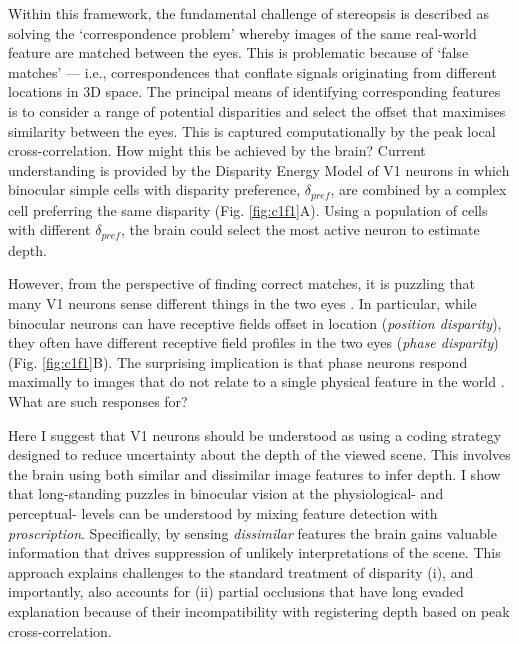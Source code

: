Within this framework, the fundamental challenge of stereopsis is described as solving the `correspondence problem' \cite{Julesz:1971uq,Marr:1976dq,Scharstein:2002by} whereby images of the same real-world feature are matched between the eyes. This is problematic because of `false matches' --- i.e., correspondences that conflate signals originating from different locations in 3D space. The principal means of identifying corresponding features is to consider a range of potential disparities and select the offset that maximises similarity between the eyes. This is captured computationally by the peak local cross-correlation. How might this be achieved by the brain? Current understanding is provided by the Disparity Energy Model of V1 neurons \cite{Ohzawa:1990cq, Fleet:1996tq, Qian:1997bu} in which binocular simple cells with disparity preference, $\delta_{pref}$, are combined by a complex cell preferring the same disparity (Fig. \ref{fig:c1f1}A). Using a population of cells with different $\delta_{pref}$, the brain could select the most active neuron to estimate depth.

However, from the perspective of finding correct matches, it is puzzling that many V1 neurons sense different things in the two eyes \cite{DeAngelis:1991mb, Prince:2002uq, Tsao:2003pi}. In particular, while binocular neurons can have receptive fields offset in location ({\it position disparity}), they often have different receptive field profiles in the two eyes ({\it phase disparity}) (Fig. \ref{fig:c1f1}B). The surprising implication is that phase neurons respond maximally to images that do not relate to a single physical feature in the world \cite{Read:2007nx}. What are such responses for? 

Here I suggest that V1 neurons should be understood as using a coding strategy designed to reduce uncertainty about the depth of the viewed scene. This involves the brain using both similar and dissimilar image features to infer depth. I show that long-standing puzzles in binocular vision at the physiological- and perceptual- levels can be understood by mixing feature detection with \emph {proscription}. Specifically, by sensing \emph {dissimilar} features the brain gains valuable information that drives suppression of unlikely interpretations of the scene. This approach explains challenges to the standard treatment of disparity (i), and importantly, also accounts for (ii) partial occlusions that have long evaded explanation because of their incompatibility with registering depth based on peak cross-correlation. 

